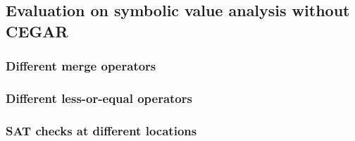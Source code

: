 \subsection{Evaluation on symbolic value analysis without CEGAR}
\subsubsection{Different merge operators}
\subsubsection{Different less-or-equal operators}
\subsubsection{SAT checks at different locations}
